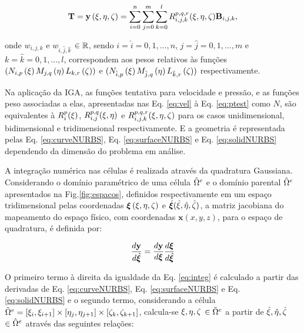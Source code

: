 \documentclass[tese_patricia]{subfiles}
\begin{document}
\begin{align}
\mathbf{T} = \mathbf{y}\left(\xi,\eta,\zeta\right) = \sum_{i=0}^{n}\sum_{j=0}^{m}\sum_{k=0}^{l}R_{i,j,k}^{p,q,r}(\xi,\eta,\zeta)\mathbf{B}_{i,j,k}, \label{eq:solidNURBS}
\end{align}

\noindent onde $w_{i,j,k}$ e $w_{\hat{i},\hat{j},\hat{k}}$ $\in \mathbb{R}$, sendo $i = \hat{i} =  0, 1, ... , n$, $j = \hat{j} =  0, 1, ... , m$ e $k = \hat{k} =  0, 1, ... , l$, correspondem aos pesos relativos às funções $\left(N_{i,p}\left(\xi\right)M_{j,q}\left(\eta\right)L_{k,r}\left(\zeta\right)\right)$ e $(N_{\hat{i},p}\left(\xi\right)M_{\hat{j},q}\left(\eta\right)L_{\hat{k},r}\left(\zeta\right))$ respectivamente.

Na aplicação da IGA, as funções tentativa para velocidade e pressão, e as funções peso associadas a elas, apresentadas nas Eq. \eqref{eq:vel} à Eq. \eqref{eq:ptest} como $N$, são equivalentes à $R_{i}^{p}(\xi)$, $R_{i,j}^{p,q}(\xi,\eta)$ e $R_{i,j,k}^{p,q,r}(\xi,\eta,\zeta)$ para os casos unidimensional, bidimensional e tridimensional respectivamente. E a geometria é representada pelas Eq. \eqref{eq:curveNURBS}, Eq. \eqref{eq:surfaceNURBS} e Eq. \eqref{eq:solidNURBS} dependendo da dimensão do problema em análise. 

A integração numérica nas células é realizada através da quadratura Gaussiana. Considerando o domínio paramétrico de uma célula $\tilde{\Omega}^{e}$ e o domínio parental $\hat{\Omega}^{e}$  apresentados na Fig.\ref{fig:espacos}, definidos respectivamente em um espaço tridimensional pelas coordenadas $\bm{\xi}\left(\xi,\eta,\zeta\right)$ e $\hat{\bm{\xi}}(\hat{\xi},\hat{\eta},\hat{\zeta})$, a matriz jacobiana do mapeamento do espaço físico, com coordenadas $\mathbf{x} \left(x,y,z\right)$,  para o espaço de quadratura, é definida por:

\begin{align}
\frac{d\mathbf{y}}{d\hat{\bm{\xi}}} = \frac{d\mathbf{y}}{d\bm{\xi}} \frac{d\bm{\xi}}{d\hat{\bm{\xi}}} \label{eq:integ}
\end{align}

O primeiro termo à direita da igualdade da Eq. \eqref{eq:integ} é calculado a partir das derivadas de Eq. \eqref{eq:curveNURBS}, Eq. \eqref{eq:surfaceNURBS} e Eq. \eqref{eq:solidNURBS} e o segundo termo, considerando a célula $\tilde{\Omega}^{e} = [\xi_{i},\xi_{i+1}] \times [\eta_{j},\eta_{j+1}] \times [\zeta_{k},\zeta_{k+1}]$, calcula-se $\xi,\eta, \zeta$ $\in \tilde{\Omega}^{e}$ a partir de $\hat{\xi},\hat{\eta}, \hat{\zeta}$ $\in \hat{\Omega}^{e}$ através das seguintes relações: 
\end{document}
